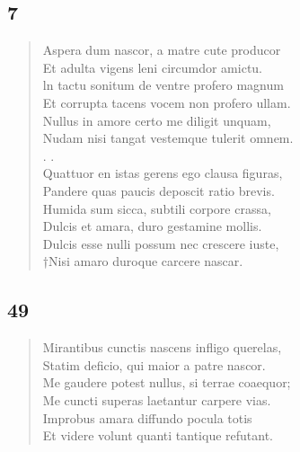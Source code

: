 \documentclass[11pt, a4paper]{report}
\begin{document}
            \subsection*{7}
      \begin{verse}
      Aspera dum nascor, a matre cute producor \\ Et adulta vigens leni circumdor amictu. \\ ln tactu sonitum de ventre profero magnum \\ Et corrupta tacens vocem non profero ullam. \\ Nullus in amore certo me diligit unquam, \\ Nudam nisi tangat vestemque tulerit omnem. \\ 
        ﻿\pagebreak 
    . . \\ Quattuor en istas gerens ego clausa figuras, \\ Pandere quas paucis deposcit ratio brevis. \\ Humida sum sicca, subtili corpore crassa, \\ Dulcis et amara, duro gestamine mollis. \\ Dulcis esse nulli possum nec crescere iuste, \\ †Nisi amaro duroque carcere nascar. \\ 
      \end{verse}
  
            \subsection*{49}
      \begin{verse}
      Mirantibus cunctis nascens infligo querelas, \\ Statim deficio, qui maior a patre nascor. \\ Me gaudere potest nullus, si terrae coaequor; \\ Me cuncti superas laetantur carpere vias. \\ Improbus amara diffundo pocula totis \\ Et videre volunt quanti tantique refutant. \\ 
      \end{verse}
  
\end{document}
